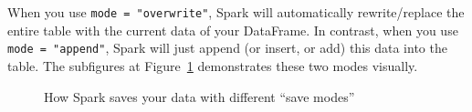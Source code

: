 \documentclass[
  11pt,
  letterpaper,
  DIV=11,
  numbers=noendperiod]{scrreprt}
\begin{document}
When you use \texttt{mode\ =\ "overwrite"}, Spark will automatically
rewrite/replace the entire table with the current data of your
DataFrame. In contrast, when you use \texttt{mode\ =\ "append"}, Spark
will just append (or insert, or add) this data into the table. The
subfigures at Figure~\ref{fig-save-table-modes} demonstrates these two
modes visually.

\begin{figure}

\begin{minipage}[t]{\linewidth}

{\centering 


}

\end{minipage}%
\newline
\begin{minipage}[t]{\linewidth}

{\centering 


}

\end{minipage}%

\caption{\label{fig-save-table-modes}How Spark saves your data with
different ``save modes''}

\end{figure}
\end{document}
